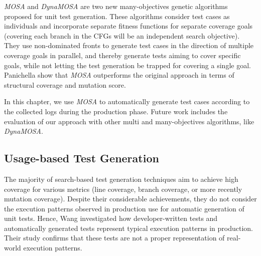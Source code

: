 
\textit{MOSA} \cite{Panichella2015} and \textit{DynaMOSA} \cite{Panichella2018} are two new many-objectives genetic algorithms proposed for unit test generation. These algorithms consider test cases as individuals and incorporate separate fitness functions for separate coverage goals (\eg covering each branch in the CFGs will be an independent search objective). They use non-dominated fronts to generate test cases in the direction of multiple coverage goals in parallel, and thereby generate tests aiming to cover specific goals, while not letting the test generation be trapped for covering a single goal. Panichella \etal \cite{Panichella2015} show that \textit{MOSA} outperforms the original \evosuite approach in terms of structural coverage and mutation score.

In this chapter, we use \textit{MOSA} to automatically generate test cases according to the collected logs during the production phase. Future work includes the evaluation of our approach with other multi and many-objectives algorithms, like \textit{DynaMOSA}.

\subsection{Usage-based Test Generation}
\label{sec:cub:usage-based-test-generation}

The majority of search-based test generation techniques aim to achieve high coverage for various metrics (\eg line coverage, branch coverage, or more recently mutation coverage).
Despite their considerable achievements, they do not consider the execution patterns observed in production use for automatic generation of unit tests. Hence, Wang \etal \cite{Wang2017} investigated how developer-written tests and automatically generated tests represent typical execution patterns in production. Their study confirms that these tests are not a proper representation of real-world execution patterns.

